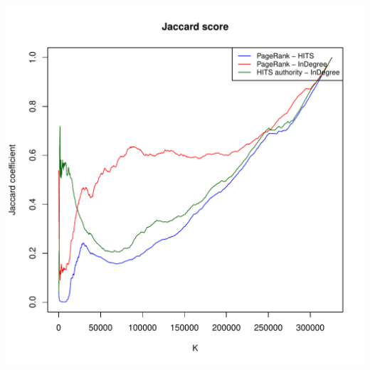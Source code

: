\documentclass[10pt]{article}
\begin{document}
\includegraphics[scale=0.8]{img/jaccard-all.pdf}
\end{document}
